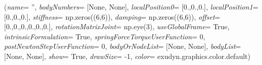 %
\begin{flushleft}
\label{sec:mainsystemextensions:CreateRigidBodySpringDamper}
({\it name}= '', {\it bodyNumbers}= [None, None], {\it localPosition0}= [0.,0.,0.], {\it localPosition1}= [0.,0.,0.], {\it stiffness}= np.zeros((6,6)), {\it damping}= np.zeros((6,6)), {\it offset}= [0.,0.,0.,0.,0.,0.], {\it rotationMatrixJoint}= np.eye(3), {\it useGlobalFrame}= True, {\it intrinsicFormulation}= True, {\it springForceTorqueUserFunction}= 0, {\it postNewtonStepUserFunction}= 0, {\it bodyOrNodeList}= [None, None], {\it bodyList}= [None, None], {\it show}= True, {\it drawSize}= -1, {\it color}= exudyn.graphics.color.default)
\end{flushleft}
\setlength{\itemindent}{0.7cm}
